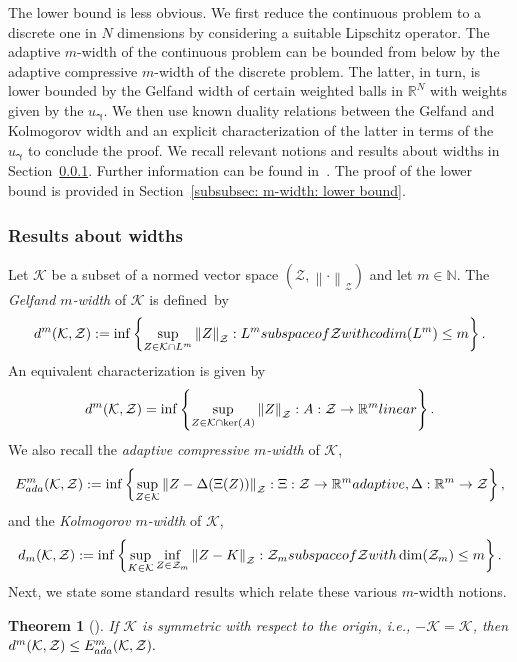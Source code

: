 \documentclass[namedate,webpdf]{ima-authoring-template-blank}
\newcommand*{\nm}[1]{{\left\|#1\right \|}}
\newcounter{counter}
\numberwithin{counter}{section}
\numberwithin{equation}{section}
\theoremstyle{plain}
\newtheorem{theorem}[counter]{Theorem}
\theoremstyle{definition}
\newcommand*{\cK}{\mathcal{K}}
\newcommand*{\cZ}{\mathcal{Z}}
\newcommand*{\bbN}{\mathbb{N}}
\newcommand*{\bbR}{\mathbb{R}}
\theoremstyle{thmstyletwo}
\begin{document}
The lower bound is less obvious. We first reduce the continuous problem to a discrete one in \(N\) dimensions by considering a suitable Lipschitz operator. The adaptive \(m\)-width of the continuous problem can be bounded from below by the adaptive compressive \(m\)-width of the discrete problem. The latter, in turn, is lower bounded by the Gelfand width of certain weighted balls in \( \bbR^N \) with weights given by the \( u_{\bm{\gamma}} \). We then use known duality relations between the Gelfand and Kolmogorov width and an explicit characterization of the latter in terms of the \( u_{\bm{\gamma}} \) to conclude the proof. We recall relevant notions and results about widths in Section~\ref{subsubsec: m-width: results about widths}. Further information can be found in~\citet[Ch. 10]{foucart_MathematicalIntroductionCompressiveSensing_2013}. The proof of the lower bound is provided in Section~\ref{subsubsec: m-width: lower bound}.



\subsubsection{Results about widths}
\label{subsubsec: m-width: results about widths} 

Let \(\cK\) be a subset of a normed vector space \((\cZ, \nm{\cdot}_{\cZ})\) and let \(m \in \bbN\).
The \emph{Gelfand \(m\)-width} of \(\cK\) is defined~by
\[
d^m(\cK, \cZ) := \inf\left\{\sup_{Z \in \cK \cap L^m} \nm{Z}_\cZ: L^m \textup{ subspace of } \cZ \textup{ with codim}(L^m) \leq m\right\}.
\]
An equivalent characterization is given by
\[
d^m(\cK, \cZ) = \inf\left\{\sup_{Z \in \cK \cap \ker(A)} \nm{Z}_{\cZ}: A: \cZ \to \bbR^m \textup{ linear} \right\}.
\]
We also recall the \emph{adaptive compressive \(m\)-width} of \(\cK\),
\[
E_{\textup{ada}}^m(\cK, \cZ) := \inf\left\{\sup_{Z \in \cK} \nm{Z - \Delta(\Xi(Z))}_{\cZ}: \Xi: \cZ \to \bbR^m \textup{ adaptive, } \Delta: \bbR^m \to \cZ \right\},
\]
and the \emph{Kolmogorov \(m\)-width} of \(\cK\),
\[
d_m(\cK,\cZ) := 
\inf\left\{
\sup_{K \in \cK} \inf_{Z \in \cZ_m} \nm{Z - K}_{\cZ}: \cZ_m \textup{ subspace of } \cZ \textup{ with } \dim(\cZ_m) \leq m 
\right\}.
\]
Next, we state some standard results which relate these various \(m\)-width notions. 
\begin{theorem}[{\citet[Thm. 10.4]{foucart_MathematicalIntroductionCompressiveSensing_2013}}]
\label{thm: Gelfand width <= adaptive compressive width}
    If \(\cK\) is symmetric with respect to the origin, i.e., \(- \cK = \cK\), then 
    \(
    d^m(\cK, \cZ) \leq E_{\textup{ada}}^m(\cK, \cZ).
    \)
\end{theorem}
\end{document}
